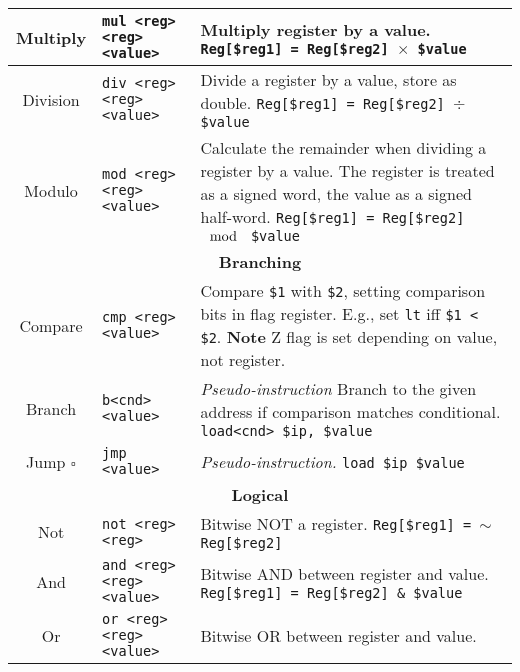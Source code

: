 \documentclass[10pt]{article}
\begin{document}
\begin{longtable}{|c|l|l|}
    \hline
    Multiply & \texttt{mul <reg> <reg> <value>} & \makecell[l]{Multiply register by a value.\\%
    \texttt{Reg[\$reg1] = Reg[\$reg2] \(\times\) \$value}} \\
    \hline
    Division & \texttt{div <reg> <reg> <value>} & \makecell[l]{Divide a register by a value, store as double.\\%
    \texttt{Reg[\$reg1] = Reg[\$reg2] \(\div\) \$value}} \\
    \hline
    Modulo & \texttt{mod <reg> <reg> <value>} & \makecell[l]{Calculate the remainder when dividing a register by a value.\\%
    The register is treated as a signed word,\\%
    the value as a signed half-word.\\%
    \texttt{Reg[\$reg1] = Reg[\$reg2] \(\mod\) \$value}} \\
    \hline \hline
    \multicolumn{3}{|c|}{\textbf{Branching}} \\
    \hline
    Compare & \texttt{cmp <reg> <value>} & \makecell[l]{Compare \texttt{\$1} with \texttt{\$2}, setting comparison bits in flag register.\\%
    E.g., set \texttt{lt} iff \texttt{\$1 < \$2}.\\%
    \textbf{Note} Z flag is set depending on value, not register.} \\
    \hline
    Branch & \texttt{b<cnd> <value>} & \makecell[l]{\textit{Pseudo-instruction}\\%
    Branch to the given address if comparison matches conditional.\\%
    \texttt{load<cnd> \$ip, \$value}} \\
    \hline
    Jump \(\square\) & \texttt{jmp <value>} & \makecell[l]{\textit{Pseudo-instruction.}\\%
    \texttt{load \$ip \$value}} \\
    \hline \hline
    \multicolumn{3}{|c|}{\textbf{Logical}} \\
    \hline
    Not & \texttt{not <reg> <reg>} & \makecell[l]{Bitwise NOT a register.\\%
    \texttt{Reg[\$reg1] = \(\sim\) Reg[\$reg2]}} \\
    \hline
    And & \texttt{and <reg> <reg> <value>} & \makecell[l]{Bitwise AND between register and value.\\%
    \texttt{Reg[\$reg1] = Reg[\$reg2] \& \$value}} \\
    \hline
    Or & \texttt{or <reg> <reg> <value>} & \makecell[l]{Bitwise OR between register and value.\\%
}
\end{longtable}
\end{document}
